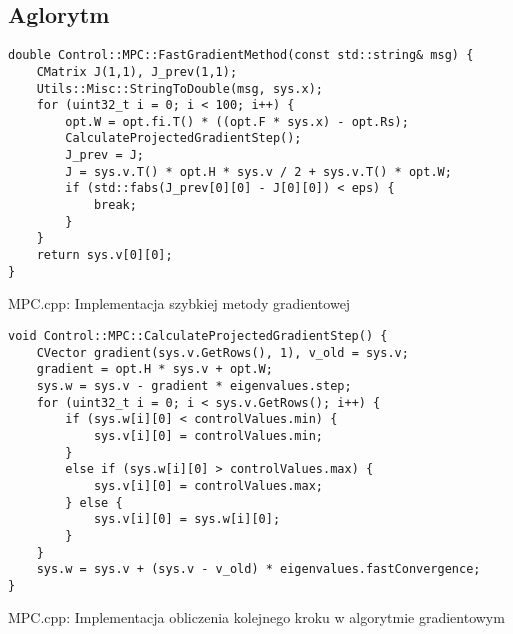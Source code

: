 \subsection{Aglorytm} \label{sec:algorithm}
\begin{listing}[htb]
\begin{verbatim}
double Control::MPC::FastGradientMethod(const std::string& msg) {
    CMatrix J(1,1), J_prev(1,1);
    Utils::Misc::StringToDouble(msg, sys.x);
    for (uint32_t i = 0; i < 100; i++) {
        opt.W = opt.fi.T() * ((opt.F * sys.x) - opt.Rs);
        CalculateProjectedGradientStep();
        J_prev = J;
        J = sys.v.T() * opt.H * sys.v / 2 + sys.v.T() * opt.W;
        if (std::fabs(J_prev[0][0] - J[0][0]) < eps) {
            break;
        }
    }
    return sys.v[0][0];
}
\end{verbatim}
\caption{MPC.cpp: Implementacja szybkiej metody gradientowej}
\label{lst:gradient_cpp}
\end{listing}

\begin{listing}[htb]
\begin{verbatim}
void Control::MPC::CalculateProjectedGradientStep() {
    CVector gradient(sys.v.GetRows(), 1), v_old = sys.v;
    gradient = opt.H * sys.v + opt.W;
    sys.w = sys.v - gradient * eigenvalues.step;
    for (uint32_t i = 0; i < sys.v.GetRows(); i++) {
        if (sys.w[i][0] < controlValues.min) {
            sys.v[i][0] = controlValues.min;
        }
        else if (sys.w[i][0] > controlValues.max) {
            sys.v[i][0] = controlValues.max;
        } else {
            sys.v[i][0] = sys.w[i][0];
        }
    }
    sys.w = sys.v + (sys.v - v_old) * eigenvalues.fastConvergence;
}
\end{verbatim}
\caption{MPC.cpp: Implementacja obliczenia kolejnego kroku w algorytmie gradientowym}
\label{lst:step_cpp}
\end{listing}

